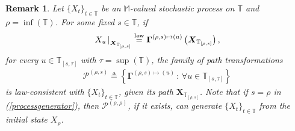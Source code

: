 \documentclass[12pt,a4paper]{article}
\newtheorem{rem}[thm]{Remark}
\def\T{\mathbb{T}}
\def\law{\overset{\textnormal{law}}{=}}
\begin{document}
\begin{rem}
\label{stochasticassociation} {\em
Let $\{X_t\}_{t\in\T}$ be an $\mathbb M$-valued stochastic process on $\T$ and $\rho=\inf(\T)$. For some fixed $s\in \T$, if
\begin{align}
\left. X_u \, \right|_{\boldsymbol{X}_{\T_{[\rho,s]}}} \law \boldsymbol{\Gamma}^{(\rho,s)\mapsto(u)}\left( \boldsymbol{X}_{\T_{[\rho,s]}}\right), \label{processgenerator}
\end{align}
for every $u \in \T_{[s,\tau]}$ with $\tau=\sup(\T)$, the family of path transformations 
\begin{align}
\mathcal{P}^{(\rho,s)} \triangleq \left\{\boldsymbol{\Gamma}^{(\rho,s)\mapsto(u)} \, : \, \forall u \in \T_{[s,\tau]} \right\} \label{familypathransforms}
\end{align}
is law-consistent with $\{X_t\}_{t\in\T}$, given its path $\boldsymbol{X}_{\T_{[\rho,s]}}$. Note that if $s=\rho$ in (\ref{processgenerator}), then $\mathcal{P}^{(\rho,\rho)}$, if it exists, can generate $\{X_t\}_{t\in\T}$ from the initial state $X_{\rho}$. }
\end{rem}

\end{document}
